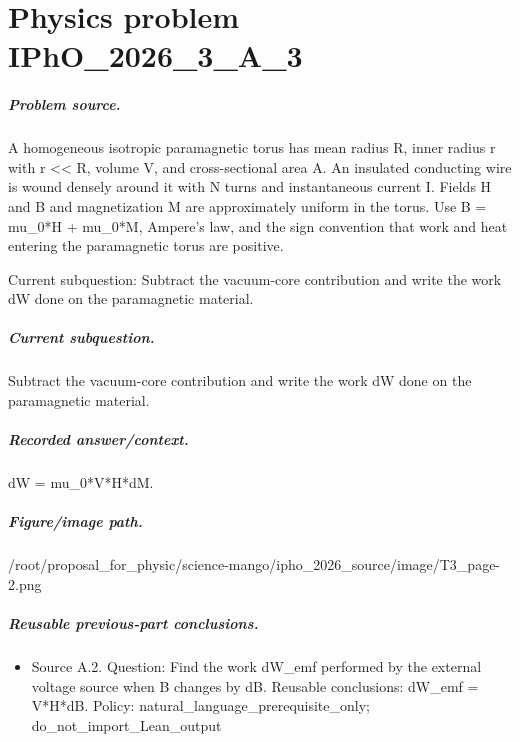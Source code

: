 
\chapter{Physics problem IPhO\_2026\_3\_A\_3}
\label{ch:IPhO2026Problems_problem_IPhO_2026_3_A_3}

\paragraph{Problem source.}
A homogeneous isotropic paramagnetic torus has mean radius R, inner radius r
with r << R, volume V, and cross-sectional area A.  An insulated conducting
wire is wound densely around it with N turns and instantaneous current I.
Fields H and B and magnetization M are approximately uniform in the torus.
Use B = mu\_0*H + mu\_0*M, Ampere's law, and the sign convention that work and
heat entering the paramagnetic torus are positive.

Current subquestion:
Subtract the vacuum-core contribution and write the work dW done on the paramagnetic material.

\paragraph{Current subquestion.}
Subtract the vacuum-core contribution and write the work dW done on the paramagnetic material.

\paragraph{Recorded answer/context.}
dW = mu\_0*V*H*dM.

\paragraph{Figure/image path.}
/root/proposal\_for\_physic/science-mango/ipho\_2026\_source/image/T3\_page-2.png

\paragraph{Reusable previous-part conclusions.}
\begin{itemize}
\item Source A.2. Question: Find the work dW\_emf performed by the external voltage source when B changes by dB. Reusable conclusions: dW\_emf = V*H*dB. Policy: natural\_language\_prerequisite\_only; do\_not\_import\_Lean\_output
\end{itemize}

